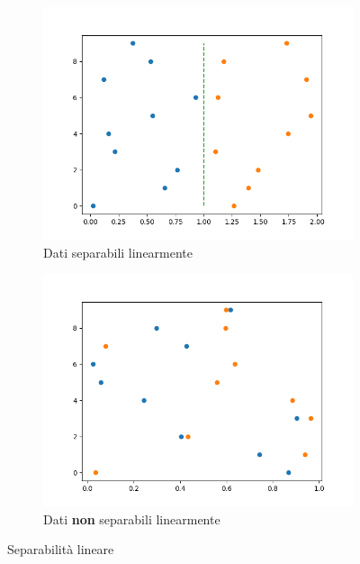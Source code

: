 \documentclass[12pt, twoside, letterpaper]{report}
\begin{document}
			\begin{figure}
				\begin{subfigure}[]{.5\textwidth}
					\centering
					\includegraphics[width=.9\linewidth]{linearly_separable.png}
					\caption{Dati separabili linearmente}
					\label{fig:linearly_separable}
				\end{subfigure}
				\hfill
				\begin{subfigure}[]{.5\textwidth}
					\centering
					\includegraphics[width=.9\linewidth]{not_linearly_separable.png}
					\caption{Dati \textbf{non} separabili linearmente}
					\label{fig:not_linearly_separable}
				\end{subfigure}
				
				\caption{Separabilità lineare}
			\end{figure}	

				
				 
\end{document}
